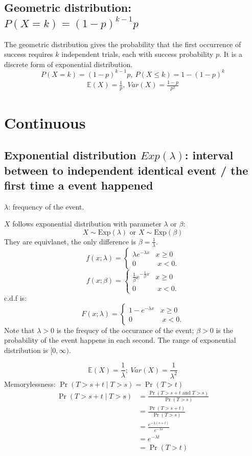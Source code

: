 \documentclass[11pt]{elegantbook}
\begin{document}
\subsection{Geometric distribution: $P(X=k)=(1-p)^{k-1}p$}
The geometric distribution gives the probability that the first occurrence of success requires $k$ independent trials, each with success probability $p$. It is a discrete form of exponential distribution.
$$P(X=k)=(1-p)^{k-1}p,\ P(X\leq k)=1-(1-p)^k$$
\begin{equation}
    \begin{aligned}
        \mathbb{E}(X)=\frac{1}{p},\ Var(X)=\frac{1-p}{p^2}
    \end{aligned}
    \nonumber
\end{equation}

\section{Continuous}
\subsection{Exponential distribution $Exp(\lambda)$: interval between to independent identical event / the first time a event happened}
$\lambda$: frequency of the event.

$X$ follows exponential distribution with parameter $\lambda$ or $\beta$:
$${\displaystyle X\sim {\text{Exp}}(\lambda )} \text{ or } {\displaystyle X\sim {\text{Exp}}(\beta )}$$
They are equivlanet, the only difference is $\beta=\frac{1}{\lambda}$.
$${f(x;{\lambda})=\left\{{\begin{matrix}{\lambda }e^{-{\lambda }x}&x\geq 0\\0&\;x<0.\end{matrix}}\right.}$$
$${f(x;{\beta})=\left\{{\begin{matrix}{\frac{1}{\beta} }e^{-{\frac{1}{\beta} }x}&x\geq 0\\0&\;x<0.\end{matrix}}\right.}$$
c.d.f is:
$${F(x;{\lambda})=\left\{{\begin{matrix}{1-}e^{-{\lambda }x}&x\geq 0\\0&\;x<0.\end{matrix}}\right.}$$
Note that $\lambda > 0$ is the frequcy of the occurance of the event; $\beta>0$ is the probability of the event happens in each second. The range of exponential distribution is $[0,\infty)$.

$$\mathbb{E}(X)=\frac{1}{\lambda};\ Var(X)=\frac{1}{\lambda^2}$$
Memorylessness: ${\displaystyle \Pr \left(T>s+t\mid T>s\right)=\Pr(T>t)}$
\begin{equation}
    \begin{aligned}
        \Pr (T>s+t\mid T>s)&=\frac{\Pr(T>s+t\text{ and }T>s)}{\Pr(T>s)}\\
        &=\frac{\Pr(T>s+t)}{\Pr(T>s)}\\
        &=\frac{e^{-\lambda(s+t)}}{e^{-\lambda s}}\\
        &=e^{-\lambda t}\\
        &=\Pr (T>t)
    \end{aligned}
    \nonumber
\end{equation}
\end{document}
